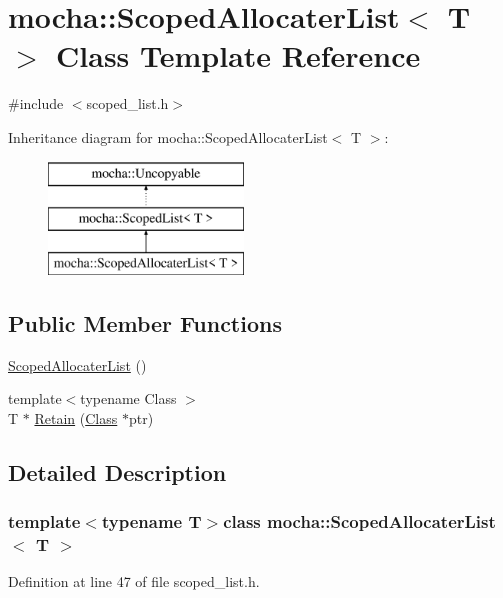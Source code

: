 \hypertarget{classmocha_1_1_scoped_allocater_list}{
\section{mocha::ScopedAllocaterList$<$ T $>$ Class Template Reference}
\label{classmocha_1_1_scoped_allocater_list}
}


{\ttfamily \#include $<$scoped\_\-list.h$>$}

Inheritance diagram for mocha::ScopedAllocaterList$<$ T $>$:\begin{figure}[H]
\begin{center}
\leavevmode
\includegraphics[height=3.000000cm]{classmocha_1_1_scoped_allocater_list}
\end{center}
\end{figure}
\subsection*{Public Member Functions}
\begin{DoxyCompactItemize}
\item 
\hyperlink{classmocha_1_1_scoped_allocater_list_ac7d1b5a8890a54b7586c3bf8ed6ef59e}{ScopedAllocaterList} ()
\item 
{\footnotesize template$<$typename Class $>$ }\\T $\ast$ \hyperlink{classmocha_1_1_scoped_allocater_list_a1d09e29e47c41dd631ce3e591559f5c8}{Retain} (\hyperlink{classmocha_1_1_class}{Class} $\ast$ptr)
\end{DoxyCompactItemize}


\subsection{Detailed Description}
\subsubsection*{template$<$typename T$>$class mocha::ScopedAllocaterList$<$ T $>$}



Definition at line 47 of file scoped\_\-list.h.




